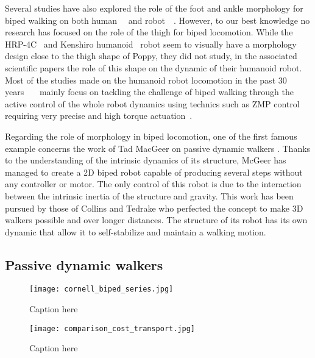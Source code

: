 Several studies have also explored the role of the foot and ankle morphology for biped walking on both human~\cite{Adamczyk2006}~\cite{Hughes1990} and robot~\cite{hobbelen2005ankle}~\cite{Davis2010}.
However, to our best knowledge no research has focused on the role of the thigh for biped locomotion.
While the HRP-4C~\cite{kaneko2009cybernetic} and Kenshiro humanoid~\cite{nakanishi2013design} robot seem to visually have a morphology design close to the thigh shape of Poppy, they did not study, in the associated scientific papers the role of this shape on the dynamic of their humanoid robot.
Most of the studies made on the humanoid robot locomotion in the past 30 years~\cite{park1998biped}~\cite{aoi2005locomotion}~\cite{park1998biped} mainly focus on tackling the challenge of biped walking through the active control of the whole robot dynamics using technics such as ZMP control~\cite{vukobratovic2004zero} requiring very precise and high torque actuation~\cite{akachi2005development}.

Regarding the role of morphology in biped locomotion, one of the first famous example concerns the work of Tad MacGeer on passive dynamic walkers \cite{mcgeer1990passive}.
Thanks to the understanding of the intrinsic dynamics of its structure, McGeer has managed to create a 2D biped robot capable of producing several steps without any controller or motor.
The only control of this robot is due to the interaction between the intrinsic inertia of the structure and gravity.
This work has been pursued by those of Collins \cite{collins2001three} and Tedrake \cite{Tedrake2004}  who perfected the concept to make 3D walkers possible and over longer distances.
The structure of its robot has its own dynamic that allow it to self-stabilize and maintain a walking motion.



\subsection{Passive dynamic walkers} %



\begin{figure}[]
    \begin{center}
        \texttt{[image: cornell\_biped\_series.jpg]}
    \end{center}
    \caption{Caption here}
    \label{fig:figure1}
\end{figure}

\begin{figure}[]
    \begin{center}
        \texttt{[image: comparison\_cost\_transport.jpg]}
    \end{center}
    \caption{Caption here}
    \label{fig:figure1}
\end{figure}



